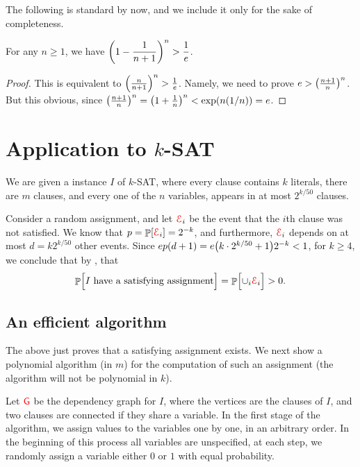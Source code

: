 
The following is standard by now, and we include it only for the sake
of completeness.
\begin{lemma}
    For any $n \geq 1$, we have $\ds \pth[]{1- \frac{1}{n+1}}^n >
    \frac{1}{e}$.
\end{lemma}
\begin{proof}
    This is equivalent to $\pth{\frac{n}{n+1}}^n >
    \frac{1}{e}$. Namely, we need to prove $e >
    \pth{\frac{n+1}{n}}^n$. But this obvious, since
    $\pth{\frac{n+1}{n}}^n = \pth{1 + \frac{1}{n}}^n < \exp
    \pth{n(1/n)} = e$.
\end{proof}

\section{Application to $k$-SAT}

We are given a instance $I$ of $k$-SAT, where every clause
contains $k$ literals, there are $m$ clauses, and every one
of the $n$ variables, appears in at most $2^{k/50}$
clauses. 

Consider a random assignment, and let ${\textcolor{red}{\EuScript{E}}}_i$ be the event that the
$i$th clause was not satisfied. We know that $p = \Prob{\Event_i} =
2^{-k}$, and furthermore, ${\textcolor{red}{\EuScript{E}}}_i$ depends on at most $d = k
2^{k/50}$ other events. Since $e p(d+1) = e \pth{k\cdot 2^{k/50} +
   1}2^{-k}<1$, for $k\geq 4$, we conclude that by ,
that
\begin{align*}
\Prob{ \Bigl. I \text{ have a satisfying assignment}}%
=%
\Prob{ \Bigl. \cup_{i} \Event_i} > 0.
\end{align*}

\subsection{An efficient algorithm}

The above just proves that a satisfying assignment exists. We next
show a polynomial algorithm (in $m$) for the computation of such an
assignment (the algorithm will not be polynomial in $k$).

Let ${\textcolor{red}{\mathsf{G}}}$ be the dependency graph for $I$, where the vertices are
the clauses of $I$, and two clauses are connected if they share a
variable.  In the first stage of the algorithm, we assign values to
the variables one by one, in an arbitrary order. In the beginning of
this process all variables are unspecified, at each step, we randomly
assign a variable either $0$ or $1$ with equal probability.

